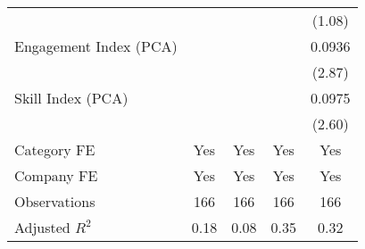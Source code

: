 {\begin{tabular}{l*{4}{c}}
                                   &                   &                   &                   &    (1.08)         \\
[1em]
Engagement Index (PCA)             &                   &                   &                   &    0.0936\sym{***}\\
                                   &                   &                   &                   &    (2.87)         \\
[1em]
Skill Index (PCA)                  &                   &                   &                   &    0.0975\sym{**} \\
                                   &                   &                   &                   &    (2.60)         \\
[1em]
Category FE                        &       Yes         &       Yes         &       Yes         &       Yes         \\
[1em]
Company FE                         &       Yes         &       Yes         &       Yes         &       Yes         \\
\hline
Observations                       &       166         &       166         &       166         &       166         \\
Adjusted \(R^{2}\)                 &      0.18         &      0.08         &      0.35         &      0.32         \\
\hline\hline
\end{tabular}
}

